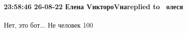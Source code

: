  
 
 
 
 

\paragraph{23:58:46 26-08-22 Елена VиктороVнаreplied to 🌹🌹олеся🌹🌹🌹}
Нет, это бот... Не человек 100%
